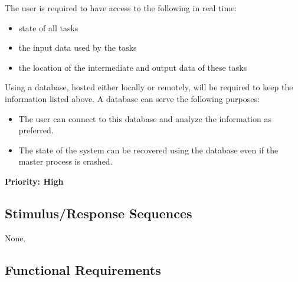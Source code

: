 \documentclass{scrreprt}
\begin{document}
The user is required to have access to the following in real time:

\begin{itemize}[noitemsep]
\item state of all tasks
\item the input data used by the tasks
\item the location of the intermediate and output data of these tasks
\end{itemize}

Using a database, hosted either locally or remotely, will be required to keep the information listed above. A database can serve the following purposes:

\begin{itemize}[noitemsep]
\item The user can connect to this database and analyze the information as preferred.
\item The state of the system can be recovered using the database even if the master process is crashed.
\end{itemize}

\textbf{Priority: High}

\subsection{Stimulus/Response Sequences}

None.

\subsection{Functional Requirements}

\end{document}

